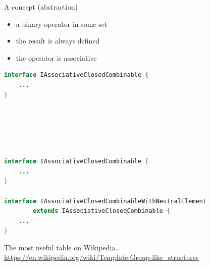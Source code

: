 \documentclass[ignorenonframetext,aspectratio=169]{beamer}
\begin{document}
\begin{frame}{A concept (abstraction)}
\begin{itemize}
\item a binary operator in some set
\item the result is always defined
\item the operator is associative
\end{itemize}
\end{frame}

\begin{frame}[fragile]
\begin{lstlisting}[language=Java]
interface IAssociativeClosedCombinable {
    ...
}




 
\end{lstlisting}
\end{frame}

\begin{frame}[fragile]
\begin{lstlisting}[language=Java]
interface IAssociativeClosedCombinable {
    ...
}

interface IAssociativeClosedCombinableWithNeutralElement
        extends IAssociativeClosedCombinable {
    ...
}
\end{lstlisting}
\end{frame}

\begin{frame}{The most useful table on Wikipedia\ldots}
\centering
{}
\tiny \url{https://en.wikipedia.org/wiki/Template:Group-like_structures}
\end{frame}
\end{document}
